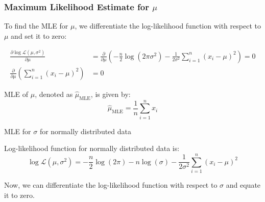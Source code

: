 \documentclass[handout]{beamer}
\begin{document}
\begin{frame}
    \frametitle{Maximum Likelihood Estimate for $\mu$}
    
    To find the MLE for $\mu$, we differentiate the log-likelihood function with respect to $\mu$ and set it to zero:
    
    \begin{align*}
        \frac{\partial \log \mathcal{L}(\mu, \sigma^2)}{\partial \mu} &= \frac{\partial}{\partial \mu} \left(-\frac{n}{2} \log (2\pi\sigma^2) - \frac{1}{2\sigma^2} \sum_{i=1}^n (x_i-\mu)^2\right) =0\\
        \frac{\partial}{\partial \mu} \left(\sum_{i=1}^n (x_i-\mu)^2\right) &= 0
    \end{align*}
    
    \begin{tcolorbox}[colback=metropolisblue!5,colframe=metropolisblue,title=Maximum Likelihood Estimate for $\mu$]
        MLE of $\mu$, denoted as $\hat{\mu}_{\text{MLE}}$, is given by:
        \begin{equation*}
            \hat{\mu}_{\text{MLE}} = \frac{1}{n}\sum_{i=1}^n x_i
        \end{equation*}
    \end{tcolorbox}
    
    \end{frame}



\begin{frame}{MLE for $\sigma$ for normally distributed data}
    \begin{tcolorbox}[colback=metropolisblue!5,colframe=metropolisblue,title=Log Likelihood Function for Univariate Normal Distribution]
        Log-likelihood function for normally distributed data is:
        \[
            \log \mathcal{L}(\mu, \sigma^2) = -\frac{n}{2} \log(2\pi) - n\log(\sigma) - \frac{1}{2\sigma^2} \sum_{i=1}^n (x_i-\mu)^2
            \]
    \end{tcolorbox}

Now, we can differentiate the log-likelihood function with respect to $\sigma$ and equate it to zero.
\end{frame}
\end{document}

